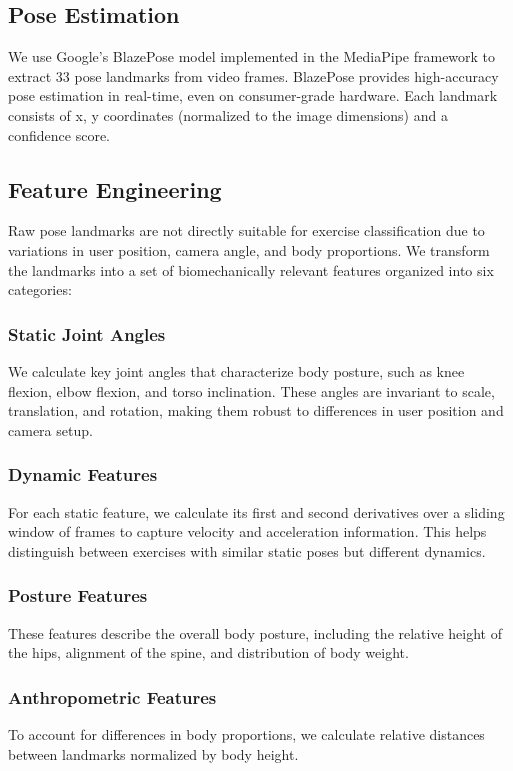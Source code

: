 \documentclass[conference]{IEEEtran}
\begin{document}
\subsection{Pose Estimation}
We use Google's BlazePose \cite{bazarevsky2020blazepose} model implemented in the MediaPipe framework to extract 33 pose landmarks from video frames. BlazePose provides high-accuracy pose estimation in real-time, even on consumer-grade hardware. Each landmark consists of x, y coordinates (normalized to the image dimensions) and a confidence score.

\subsection{Feature Engineering}
Raw pose landmarks are not directly suitable for exercise classification due to variations in user position, camera angle, and body proportions. We transform the landmarks into a set of biomechanically relevant features organized into six categories:

\subsubsection{Static Joint Angles}
We calculate key joint angles that characterize body posture, such as knee flexion, elbow flexion, and torso inclination. These angles are invariant to scale, translation, and rotation, making them robust to differences in user position and camera setup.

\subsubsection{Dynamic Features}
For each static feature, we calculate its first and second derivatives over a sliding window of frames to capture velocity and acceleration information. This helps distinguish between exercises with similar static poses but different dynamics.

\subsubsection{Posture Features}
These features describe the overall body posture, including the relative height of the hips, alignment of the spine, and distribution of body weight.

\subsubsection{Anthropometric Features}
To account for differences in body proportions, we calculate relative distances between landmarks normalized by body height.
\end{document}
